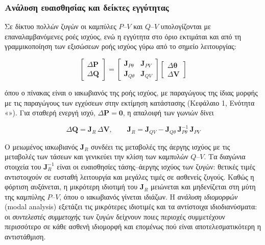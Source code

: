 \subsubsection{Ανάλυση ευαισθησίας και δείκτες εγγύτητας}

Σε δίκτυο πολλών ζυγών οι καμπύλες $P$--$V$ και $Q$--$V$ υπολογίζονται με επαναλαμβανόμενες
ροές ισχύος, ενώ η εγγύτητα στο όριο εκτιμάται και από τη γραμμικοποίηση των εξισώσεων ροής
ισχύος γύρω από το σημείο λειτουργίας:

\begin{equation}
\begin{bmatrix} \Delta\mathbf{P} \\ \Delta\mathbf{Q} \end{bmatrix} =
\begin{bmatrix} \mathbf{J}_{P\theta} & \mathbf{J}_{PV} \\
                \mathbf{J}_{Q\theta} & \mathbf{J}_{QV} \end{bmatrix}
\begin{bmatrix} \Delta\boldsymbol{\theta} \\ \Delta\mathbf{V} \end{bmatrix}
\label{eq:pf-jacobian}
\end{equation}

όπου ο πίνακας είναι ο ιακωβιανός της ροής ισχύος, με παραγώγους της ίδιας μορφής με τις
παραγώγους των εγχύσεων στην εκτίμηση κατάστασης (Κεφάλαιο 1, Ενότητα «»).
Για σταθερή ενεργή ισχύ, $\Delta\mathbf{P} = \mathbf{0}$, η απαλοιφή των γωνιών δίνει

\begin{equation}
\Delta\mathbf{Q} = \mathbf{J}_R\,\Delta\mathbf{V}, \qquad
\mathbf{J}_R = \mathbf{J}_{QV} - \mathbf{J}_{Q\theta}\,\mathbf{J}_{P\theta}^{-1}\,\mathbf{J}_{PV}
\label{eq:jr}
\end{equation}

Ο μειωμένος ιακωβιανός $\mathbf{J}_R$ συνδέει τις μεταβολές της άεργης ισχύος με τις
μεταβολές των τάσεων και γενικεύει την κλίση των καμπυλών $Q$--$V$. Τα διαγώνια στοιχεία του
$\mathbf{J}_R^{-1}$ είναι οι ευαισθησίες τάσης--άεργης ισχύος των ζυγών: θετικές τιμές
αντιστοιχούν σε ευσταθή λειτουργία και μεγάλες τιμές σε ασθενείς ζυγούς. Καθώς η φόρτιση
αυξάνεται, η μικρότερη ιδιοτιμή του $\mathbf{J}_R$ μειώνεται και μηδενίζεται στη μύτη της
καμπύλης $P$--$V$, όπου ο ιακωβιανός γίνεται ιδιάζων. Η \emph{ανάλυση ιδιομορφών} (modal
analysis) εξετάζει τις μικρότερες ιδιοτιμές και τα αντίστοιχα ιδιοδιανύσματα: οι
\emph{συντελεστές συμμετοχής} των ζυγών δείχνουν ποιες περιοχές συμμετέχουν περισσότερο σε
κάθε ασθενή ιδιομορφή και επομένως πού είναι αποτελεσματικότερη η αντιστάθμιση.

